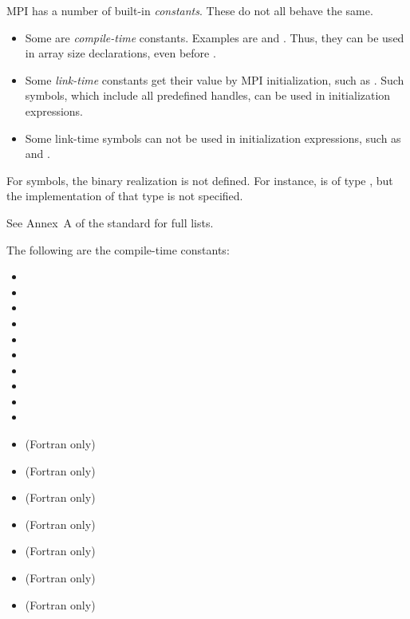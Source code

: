 MPI has a number of built-in \emph{constants}. These do not all behave
the same.
\begin{itemize}
\item Some are \emph{compile-time}
  constants. Examples are  and
  . Thus, they can be used in
  array size declarations, even before .
\item Some \emph{link-time}
  constants get their value by MPI initialization, such as
  . Such symbols, which include all
  predefined handles, can be used in initialization expressions.
\item Some link-time symbols can not be used in initialization
  expressions, such as  and .
\end{itemize}

For symbols, the binary realization is not defined. For instance,
 is of type , but
the implementation of that type is not specified.

See Annex~A of the  standard for full lists.

The following are the compile-time constants:
\begin{itemize}
\item {}
\item {}
\item {}
\item {}
\item {}
\item {}
\item {}
\item {}
\item {}
\item {}
\item {} (Fortran only)
\item {} (Fortran only)
\item {} (Fortran only)
\item {} (Fortran only)
\item {} (Fortran only)
\item {} (Fortran only)
\item {}  (Fortran only)
\end{itemize}

